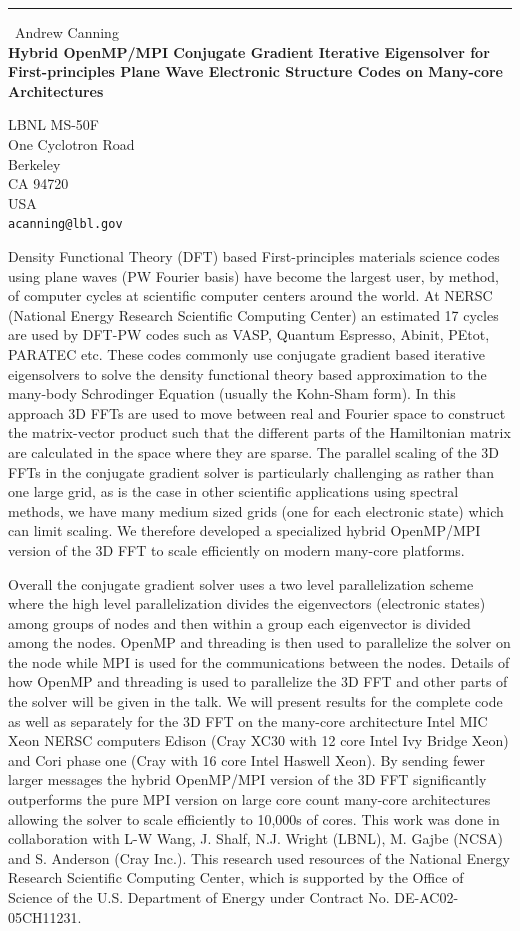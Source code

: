 \documentclass{report}
\begin{document}
\begin{center}
\rule{6in}{1pt} \
{\large Andrew Canning \\
{\bf Hybrid OpenMP/MPI Conjugate Gradient Iterative Eigensolver for First-principles Plane Wave Electronic Structure Codes on Many-core Architectures }}

LBNL MS-50F \\ One Cyclotron Road \\ Berkeley \\ CA 94720 \\ USA
\\
{\tt acanning@lbl.gov}\end{center}

Density Functional Theory (DFT) based First-principles materials science
codes using plane waves
(PW Fourier basis) have become the largest user, by method, of computer
cycles at scientific computer centers around
the world. At NERSC (National Energy Research Scientific Computing
Center) an estimated 17%
cycles are used by DFT-PW codes such as VASP, Quantum Espresso, Abinit,
PEtot, PARATEC etc.
These codes commonly use conjugate gradient based iterative eigensolvers
to solve the density functional theory based
approximation to the many-body Schrodinger Equation (usually the Kohn-Sham form).
In this approach 3D FFTs are used to move between real and Fourier space
to construct the matrix-vector product
such that the different parts of the Hamiltonian matrix are calculated in
the space where they are sparse.
The parallel scaling of the 3D FFTs in the conjugate gradient solver is
particularly challenging as rather than one large grid,
as is the case in other scientific applications using spectral methods,
we have many medium sized grids
(one for each electronic state) which can limit scaling. We therefore
developed a specialized hybrid OpenMP/MPI
version of the 3D FFT to scale efficiently on modern many-core platforms.

Overall the conjugate gradient solver uses a two level parallelization
scheme where the high level parallelization
divides the eigenvectors (electronic states) among groups of nodes and
then within a group each eigenvector is
divided among the nodes. OpenMP and threading is then used to parallelize
the solver on the node while MPI is
used for the communications between the nodes. Details of how OpenMP and
threading is used to parallelize the 3D FFT
and other parts of the solver will be given in the talk.
We will present results for the complete code as well as separately for
the 3D FFT on the many-core architecture
Intel MIC Xeon NERSC computers Edison (Cray XC30 with 12 core Intel Ivy
Bridge Xeon) and Cori phase one (Cray with 16 core
Intel Haswell Xeon).
By sending fewer larger messages the hybrid OpenMP/MPI
version of the 3D FFT significantly outperforms the pure MPI version on
large core count many-core architectures
allowing the solver to scale efficiently to 10,000s of cores. This work
was done in collaboration with L-W Wang, J. Shalf,
N.J. Wright (LBNL), M. Gajbe (NCSA) and S. Anderson (Cray Inc.).
This research used resources of the National Energy Research Scientific
Computing Center, which is supported by
the Office of Science of the U.S. Department of Energy under Contract No.
DE-AC02-05CH11231.
\end{document}
